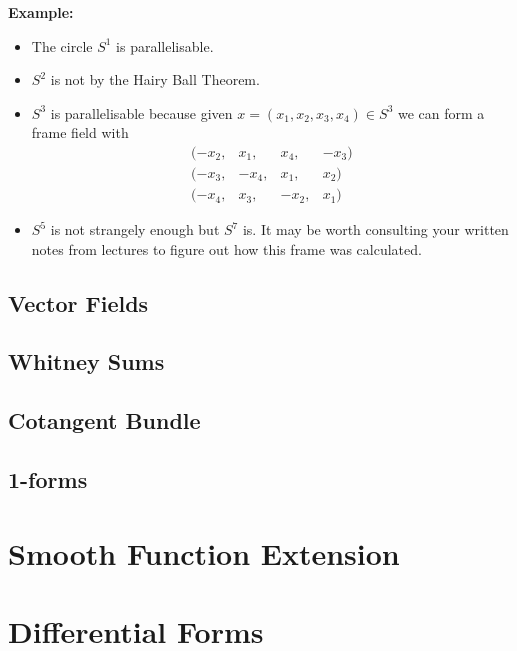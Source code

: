 \documentclass[11pt]{article}
\newenvironment{eg}
	{\begin{mdframed}[backgroundcolor=mylg,roundcorner=5pt,linewidth=0pt]\bfseries{Example:}\normalfont
	\setlength{\parindent}{0pt}}
	{\end{mdframed}}
\begin{document}
\begin{eg}
	\begin{itemize}
		\item The circle $S^1$ is parallelisable.
		\item $S^2$ is not by the Hairy Ball Theorem.
		\item $S^3$ is parallelisable because given $x=(x_1, x_2, x_3, x_4)\in S^3$ we can form a frame field with
			\[
			\begin{array}{rrrr}
				(-x_2,& x_1,& x_4,& -x_3)\\
				(-x_3,&- x_4,& x_1,& x_2)\\
				(-x_4,& x_3,& -x_2,& x_1)
			\end{array}
			\]
		\item $S^5$ is not strangely enough but $S^7$ is.
			It may be worth consulting your written notes from lectures to figure out how this frame was calculated.
	\end{itemize}
\end{eg}

\subsection{Vector Fields}

\subsection{Whitney Sums}

\subsection{Cotangent Bundle}

\subsection{1-forms}


\section{Smooth Function Extension}
\section{Differential Forms}
\end{document}
